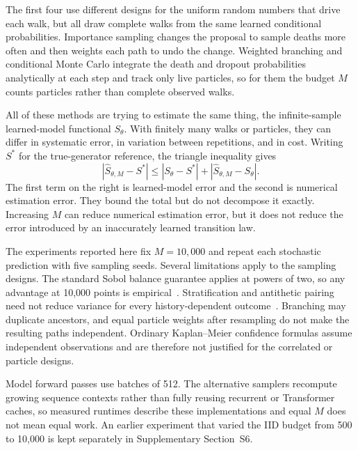 The first four use different designs for the uniform random numbers that drive each walk, but all draw complete walks from the same learned conditional probabilities. Importance sampling changes the proposal to sample deaths more often and then weights each path to undo the change. Weighted branching and conditional Monte Carlo integrate the death and dropout probabilities analytically at each step and track only live particles, so for them the budget $M$ counts particles rather than complete observed walks.

All of these methods are trying to estimate the same thing, the infinite-sample learned-model functional $S_\theta$. With finitely many walks or particles, they can differ in systematic error, in variation between repetitions, and in cost. Writing $S^*$ for the true-generator reference, the triangle inequality gives
\begin{equation}\label{eq:triangle}
|\widehat S_{\theta,M}-S^*|\le |S_\theta-S^*|+|\widehat S_{\theta,M}-S_\theta|.
\end{equation}
The first term on the right is learned-model error and the second is numerical estimation error. They bound the total but do not decompose it exactly. Increasing $M$ can reduce numerical estimation error, but it does not reduce the error introduced by an inaccurately learned transition law.

The experiments reported here fix $M=10{,}000$ and repeat each stochastic prediction with five sampling seeds. Several limitations apply to the sampling designs. The standard Sobol balance guarantee applies at powers of two, so any advantage at 10,000 points is empirical~\citep{owen1998,owen2013}. Stratification and antithetic pairing need not reduce variance for every history-dependent outcome~\citep{glasserman2004}. Branching may duplicate ancestors, and equal particle weights after resampling do not make the resulting paths independent. Ordinary Kaplan--Meier confidence formulas assume independent observations and are therefore not justified for the correlated or particle designs.

Model forward passes use batches of 512. The alternative samplers recompute growing sequence contexts rather than fully reusing recurrent or Transformer caches, so measured runtimes describe these implementations and equal $M$ does not mean equal work. An earlier experiment that varied the IID budget from 500 to 10,000 is kept separately in Supplementary Section~S6.

